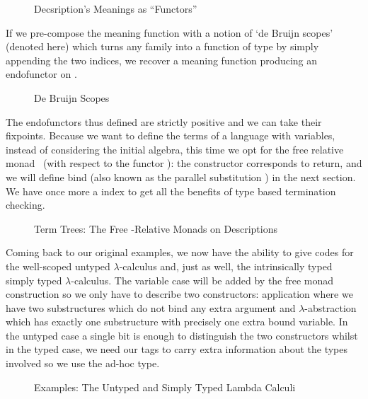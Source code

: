 \begin{figure}[h]
\caption{Decsription's Meanings as ``Functors''}
\end{figure}

If we pre-compose the meaning function  with a notion of `de Bruijn scopes'
(denoted  here) which turns any   family into a function
of type      by simply appending the two
 indices, we recover a meaning function producing an endofunctor on  .

\begin{figure}[h]
\caption{De Bruijn Scopes}
\end{figure}

The endofunctors thus defined are strictly positive and we can take their fixpoints.
Because we want to define the terms of a language with variables, instead of
considering the initial algebra, this time we opt for the free relative
monad~\cite{JFR4389} (with respect to the functor ): the 
constructor corresponds to return, and we will define bind (also known as
the parallel substitution ) in the next section. We have once more
a  index to get all the benefits of type based termination checking.

\begin{figure}[h]
\caption{Term Trees: The Free -Relative Monads on Descriptions}
\end{figure}

Coming back to our original examples, we now have the ability to give
codes for the well-scoped untyped $\lambda$-calculus and, just as well,
the intrinsically typed simply typed $\lambda$-calculus.
The variable case will be added by the free monad construction so we
only have to describe two constructors: application where we have two
substructures which do not bind any extra argument and $\lambda$-abstraction
which has exactly one substructure with precisely one extra bound variable.
In the untyped case a single bit is enough to distinguish the two constructors
whilst in the typed case, we need our tags to carry extra information about the
types involved so we use the ad-hoc  type.

\begin{figure}[h]
\begin{minipage}{0.45\textwidth}
\end{minipage}\hspace{2em}
\begin{minipage}{0.45\textwidth}
\end{minipage}
\caption{Examples: The Untyped and Simply Typed Lambda Calculi}
\end{figure}

